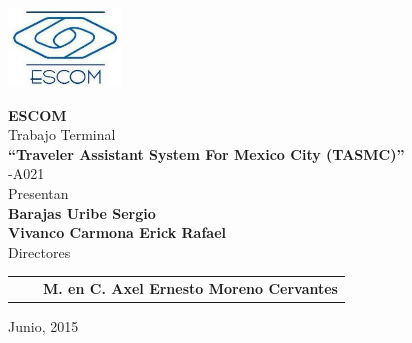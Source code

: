 \begin{minipage}[c][0.8\textheight][t]{0.2\textwidth}
\begin{center}
        \hskip2pt
    	    \latexcolumnseprulecolor \vrule width2pt height19.3cm
        \hskip0.6mm
	   \vrule width3.5pt height19.3cm
        \hskip0.6mm
        \vrule width2pt height19.3cm \\
        \includegraphics[height=2.1cm]{portada/escomC.jpg}
        \end{center}
\end{minipage}
\begin{minipage}[c][0.8\textheight][c]{0.8\textwidth}
	\begin{center}
   		\vspace{2cm}
    		{\fontsize{19}{29}\selectfont \bf ESCOM}\\
    		\vspace{1.5cm}
	    {\fontsize{13}{23}\selectfont Trabajo Terminal}\\
	    \vspace{0.3cm}
	    {\fontsize{15}{25}\selectfont \bf ``Traveler Assistant System For Mexico City (TASMC)''}\\
	    \vspace{0.3cm}
	    {\fontsize{13}{23}-A021}\\
	    \vspace{1cm}
	    {\fontsize{13}{23}\selectfont Presentan}\\
	    \vspace{0.1cm}
	    {\fontsize{14}{24}\selectfont \bf Barajas Uribe Sergio}\\
	    \vspace{0.1cm}
	    {\fontsize{14}{24}\selectfont \bf Vivanco Carmona Erick Rafael}\\
	    \vspace{1cm}
	    {\fontsize{13}{23}\selectfont Directores}\\
	    \vspace{0.5cm}
	\end{center}
	\begin{tabular}{>{\centering}p{5cm}p{1cm}>{\centering}p{5cm}}
		{\centering \fontsize{14}{24}\selectfont \bf M. en C. Macario Hernández Cruz} &
	    	& {\centering \fontsize{14}{24}\selectfont \bf M. en C. Axel Ernesto Moreno Cervantes}\\
	\end{tabular}
	\vspace{5cm}
	\begin{flushright}
		{\fontsize{11}{2}\selectfont Junio, 2015}\\	
	\end{flushright}
\end{minipage}